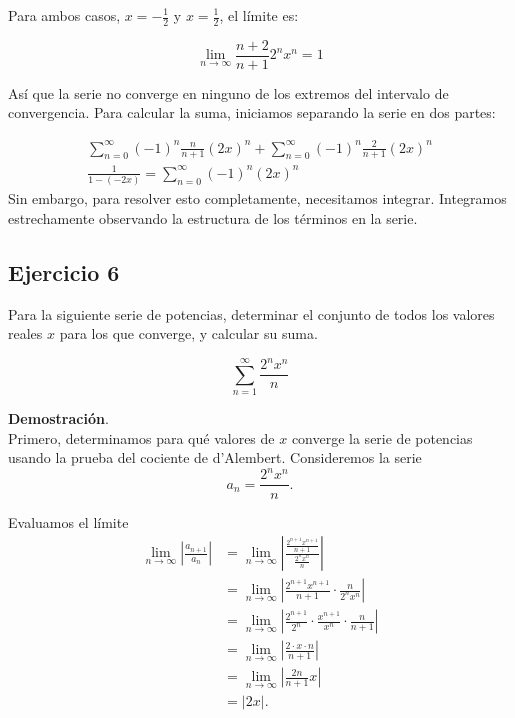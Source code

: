 \documentclass{article}
\begin{document}
    Para ambos casos, $x=-\frac{1}{2}$ y $x=\frac{1}{2}$, el límite es:

    $$
    \lim _{n \rightarrow \infty} \frac{n+2}{n+1} 2^{n} x^{n}=1
    $$

    Así que la serie no converge en ninguno de los extremos del intervalo de convergencia. Para calcular la suma, iniciamos separando la serie en dos partes:

    $$\begin{gathered}
    \sum_{n=0}^{\infty}(-1)^{n} \frac{n}{n+1}(2 x)^{n}+\sum_{n=0}^{\infty}(-1)^{n} \frac{2}{n+1}(2 x)^{n} \\
    \frac{1}{1-(-2 x)}=\sum_{n=0}^{\infty}(-1)^{n}(2 x)^{n}
    \end{gathered}
$$
    Sin embargo, para resolver esto completamente, necesitamos integrar. Integramos estrechamente observando la estructura de los términos en la serie.

    \subsection*{Ejercicio 6}

    Para la siguiente serie de potencias, determinar el conjunto de todos los valores reales $x$ para los que converge, y calcular su suma.

    $$
    \sum_{n=1}^{\infty} \frac{2^{n} x^{n}}{n}
    $$

    \textbf{Demostración}.\\

    Primero, determinamos para qué valores de $x$ converge la serie de potencias usando la prueba del cociente de d'Alembert. Consideremos la serie
    $$
    a_n = \frac{2^n x^n}{n}.
    $$

    Evaluamos el límite
    $$
    \begin{align*}
    \lim_{n \rightarrow \infty} \left|\frac{a_{n+1}}{a_{n}}\right| &= \lim_{n \rightarrow \infty} \left|\frac{\frac{2^{n+1} x^{n+1}}{n+1}}{\frac{2^{n} x^{n}}{n}}\right| \\
    &= \lim_{n \rightarrow \infty} \left|\frac{2^{n+1} x^{n+1}}{n+1} \cdot \frac{n}{2^{n} x^{n}}\right| \\
    &= \lim_{n \rightarrow \infty} \left|\frac{2^{n+1}}{2^{n}} \cdot \frac{x^{n+1}}{x^n} \cdot \frac{n}{n+1}\right| \\
    &= \lim_{n \rightarrow \infty} \left|\frac{2 \cdot x \cdot n}{n+1}\right| \\
    &= \lim_{n \rightarrow \infty} \left| \frac{2n}{n+1} x \right| \\
    &= |2x|.
    \end{align*}
    $$
\end{document}
